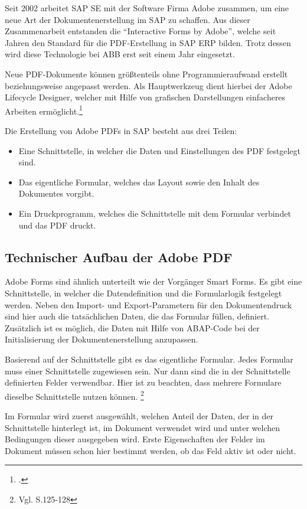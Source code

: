 Seit 2002 arbeitet SAP SE mit der Software Firma Adobe zusammen, um eine neue Art der Dokumentenerstellung im SAP zu schaffen. Aus dieser Zusammenarbeit entstanden die "`Interactive Forms by Adobe"', welche seit Jahren den Standard für die PDF-Erstellung in SAP ERP bilden. Trotz dessen wird diese Technologie bei ABB erst seit einem Jahr eingesetzt.

Neue \ac{PDF}-Dokumente können größtenteils ohne Programmieraufwand erstellt beziehungsweise angepasst werden. Als Hauptwerkzeug dient hierbei der Adobe Lifecycle Designer, welcher mit Hilfe von grafischen Darstellungen einfacheres Arbeiten ermöglicht.\footcite{Bahr.2016}

Die Erstellung von Adobe \ac{PDF}s in SAP besteht aus drei Teilen:

\begin{itemize}
	\item Eine Schnittstelle, in welcher die Daten und Einstellungen des PDF festgelegt sind.
	\item Das eigentliche Formular, welches das Layout sowie den Inhalt des Dokumentes vorgibt.
	\item Ein Druckprogramm, welches die Schnittstelle mit dem Formular verbindet und das PDF druckt.
\end{itemize}

\subsection{Technischer Aufbau der Adobe PDF}
\label{ch:Schnittstelle}

Adobe Forms sind ähnlich unterteilt wie der Vorgänger Smart Forms. Es gibt eine Schnittstelle, in welcher die Datendefinition und die Formularlogik festgelegt werden. Neben den Import- und Export-Parametern für den Dokumentendruck sind hier auch die tatsächlichen Daten, die das Formular füllen, definiert. Zusätzlich ist es möglich, die Daten mit Hilfe von \ac{ABAP}-Code bei der Initialisierung der Dokumentenerstellung anzupassen.

Basierend auf der Schnittstelle gibt es das eigentliche Formular. Jedes Formular muss einer Schnittstelle zugewiesen sein. Nur dann sind die in der Schnittstelle definierten Felder verwendbar. Hier ist zu beachten, dass mehrere Formulare dieselbe Schnittstelle nutzen können. \footnote{Vgl. \cite{Hauser.2015} S.125-128} 

Im Formular wird zuerst ausgewählt, welchen Anteil der Daten, der in der Schnittstelle hinterlegt ist, im Dokument verwendet wird und unter welchen Bedingungen dieser ausgegeben wird. Erste Eigenschaften der Felder im Dokument müssen schon hier bestimmt werden, ob das Feld aktiv ist oder nicht.


